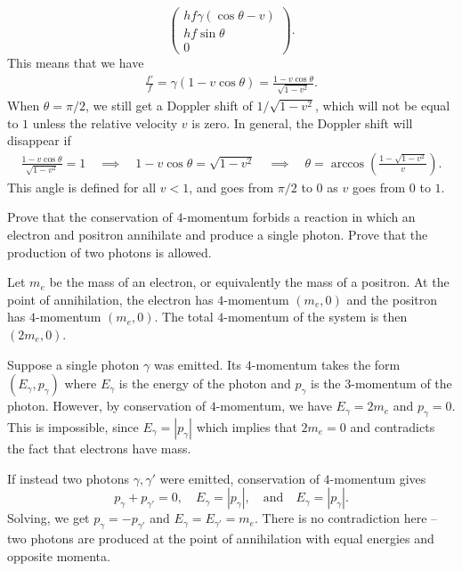 \documentclass{../../templates/lkx_pset}
\begin{document}
\begin{solution}
\[\begin{pmatrix}
			hf\gamma(\cos\theta - v)  \\ hf\sin \theta\\0
		\end{pmatrix}.
	\]
	This means that we have
	\[
		\begin{aligned}
			\frac{f'}{f} = \gamma(1-v\cos\theta) = \frac{1-v\cos\theta}{\sqrt{1-v^2}}.
		\end{aligned}
	\]
	When $\theta = \pi/2$, we still get a Doppler shift of $1/\sqrt{1-v^2}$, which will not be equal to $1$ unless the relative velocity $v$ is zero. In general, the Doppler shift will disappear if
	\[
		\begin{aligned}
			\frac{1-v\cos\theta}{\sqrt{1-v^2}} = 1\quad\implies\quad 1-v\cos\theta
			= \sqrt{1-v^2}           \quad\implies\quad
			\theta = \arccos\left(\frac{1-\sqrt{1-v^2}}{v}\right).
		\end{aligned}
	\]
	This angle is defined for all $v<1$, and goes from $\pi/2$ to $0$ as $v$ goes from $0$ to $1$.
\end{solution}

\begin{problem}{3}
Prove that the conservation of $4$-momentum forbids a reaction in which an electron and positron annihilate and produce a single photon. Prove that the production of two photons is allowed.
\end{problem}
\begin{solution}
	Let $m_e$ be the mass of an electron, or equivalently the mass of a positron. At the point of annihilation, the electron has $4$-momentum $(m_e, 0)$ and the positron has $4$-momentum $(m_e, 0)$. The total $4$-momentum of the system is then $(2m_e, 0)$.

	Suppose a single photon $\gamma$ was emitted. Its $4$-momentum takes the form $(E_\gamma, p_\gamma)$ where $E_\gamma$ is the energy of the photon and $p_\gamma$ is the $3$-momentum of the photon. However, by conservation of $4$-momentum, we have $E_\gamma=2m_e$ and $p_\gamma=0$. This is impossible, since $E_\gamma = |p_\gamma|$ which implies that $2m_e=0$ and contradicts the fact that electrons have mass.

	If instead two photons $\gamma, \gamma'$ were emitted, conservation of $4$-momentum gives
	\[
		p_\gamma + p_{\gamma'} = 0,\quad E_\gamma = |p_\gamma|,\quad\textrm{and}\quad E_{\gamma} = |p_\gamma|.
	\]
	Solving, we get $p_\gamma = -p_{\gamma'}$ and $E_\gamma=E_{\gamma'}=m_e$. There is no contradiction here -- two photons are produced at the point of annihilation with equal energies and opposite momenta.
\end{solution}
\end{document}
